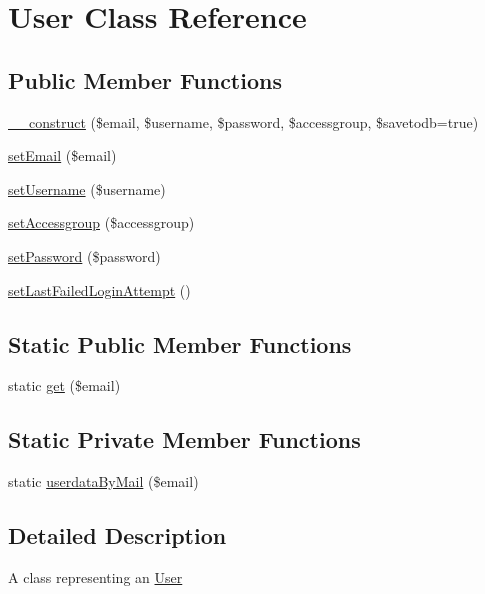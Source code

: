 \hypertarget{class_user}{}\section{User Class Reference}
\label{class_user}
\subsection*{Public Member Functions}
\begin{DoxyCompactItemize}
\item 
\hyperlink{class_user_aca1bf51a5efba9e3b88c66d12b081a2b}{\+\_\+\+\_\+construct} (\$email, \$username, \$password, \$accessgroup, \$savetodb=true)
\item 
\hyperlink{class_user_a5ef76eef42d2624386442eeb636d338c}{set\+Email} (\$email)
\item 
\hyperlink{class_user_ac359b701a2ccaff746dd480f03314244}{set\+Username} (\$username)
\item 
\hyperlink{class_user_a930ab29fc6ab2cd66840a92a7056bf53}{set\+Accessgroup} (\$accessgroup)
\item 
\hyperlink{class_user_a3e35c8d3dbb2c513c618a664389e0926}{set\+Password} (\$password)
\item 
\hyperlink{class_user_ac94366e9b326c8dc53449ddf1e7e1ecd}{set\+Last\+Failed\+Login\+Attempt} ()
\end{DoxyCompactItemize}
\subsection*{Static Public Member Functions}
\begin{DoxyCompactItemize}
\item 
static \hyperlink{class_user_a736a049fef923075462ba5a2b9d66b3e}{get} (\$email)
\end{DoxyCompactItemize}
\subsection*{Static Private Member Functions}
\begin{DoxyCompactItemize}
\item 
static \hyperlink{class_user_ac1e9c733679a192eae351365ac8eac2c}{userdata\+By\+Mail} (\$email)
\end{DoxyCompactItemize}


\subsection{Detailed Description}
A class representing an \hyperlink{class_user}{User}

